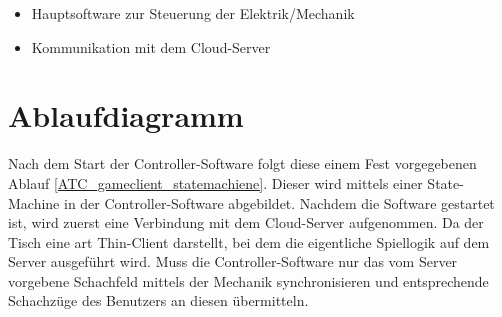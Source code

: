 \begin{itemize}
\tightlist
\item
  Hauptsoftware zur Steuerung der Elektrik/Mechanik
\item
  Kommunikation mit dem Cloud-Server
\end{itemize}

\hypertarget{ablaufdiagramm}{%
\section{Ablaufdiagramm}\label{ablaufdiagramm}}

Nach dem Start der Controller-Software folgt diese einem Fest
vorgegebenen Ablauf \ref{ATC_gameclient_statemachiene}. Dieser wird
mittels einer State-Machine in der Controller-Software abgebildet.
Nachdem die Software gestartet ist, wird zuerst eine Verbindung mit dem
Cloud-Server aufgenommen. Da der Tisch eine art Thin-Client darstellt,
bei dem die eigentliche Spiellogik auf dem Server ausgeführt wird. Muss
die Controller-Software nur das vom Server vorgebene Schachfeld mittels
der Mechanik synchronisieren und entsprechende Schachzüge des Benutzers
an diesen übermitteln.


